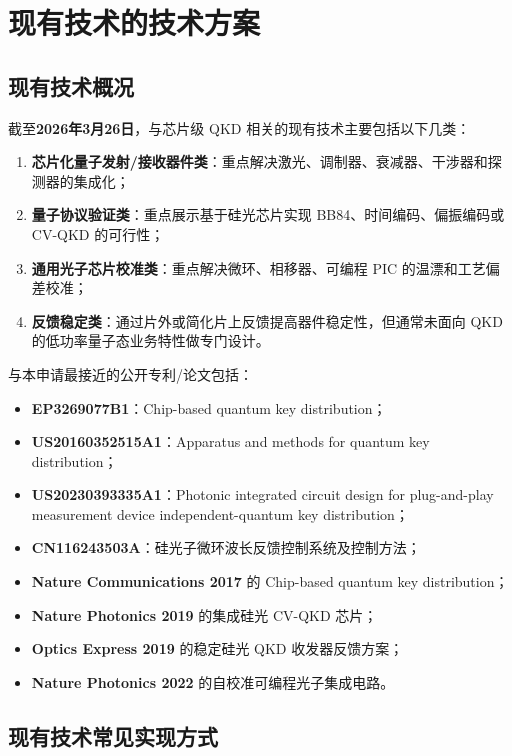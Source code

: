 \documentclass[12pt,a4paper]{article}
\begin{document}
\section{现有技术的技术方案}

\subsection{现有技术概况}

截至\textbf{2026年3月26日}，与芯片级 QKD 相关的现有技术主要包括以下几类：
\begin{enumerate}[label=(\arabic*)]
    \item \textbf{芯片化量子发射/接收器件类}：重点解决激光、调制器、衰减器、干涉器和探测器的集成化；
    \item \textbf{量子协议验证类}：重点展示基于硅光芯片实现 BB84、时间编码、偏振编码或 CV-QKD 的可行性；
    \item \textbf{通用光子芯片校准类}：重点解决微环、相移器、可编程 PIC 的温漂和工艺偏差校准；
    \item \textbf{反馈稳定类}：通过片外或简化片上反馈提高器件稳定性，但通常未面向 QKD 的低功率量子态业务特性做专门设计。
\end{enumerate}

与本申请最接近的公开专利/论文包括：
\begin{itemize}[noitemsep]
    \item \textbf{EP3269077B1}：Chip-based quantum key distribution；
    \item \textbf{US20160352515A1}：Apparatus and methods for quantum key distribution；
    \item \textbf{US20230393335A1}：Photonic integrated circuit design for plug-and-play measurement device independent-quantum key distribution；
    \item \textbf{CN116243503A}：硅光子微环波长反馈控制系统及控制方法；
    \item \textbf{Nature Communications 2017} 的 Chip-based quantum key distribution；
    \item \textbf{Nature Photonics 2019} 的集成硅光 CV-QKD 芯片；
    \item \textbf{Optics Express 2019} 的稳定硅光 QKD 收发器反馈方案；
    \item \textbf{Nature Photonics 2022} 的自校准可编程光子集成电路。
\end{itemize}

\subsection{现有技术常见实现方式}
\end{document}
